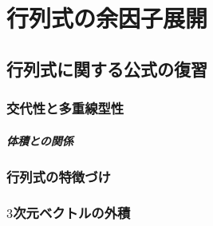\chapter{行列式の余因子展開}

\section{行列式に関する公式の復習}

\subsection{交代性と多重線型性}


\paragraph{体積との関係}

\subsection{行列式の特徴づけ}


\subsection{$3$次元ベクトルの外積}

